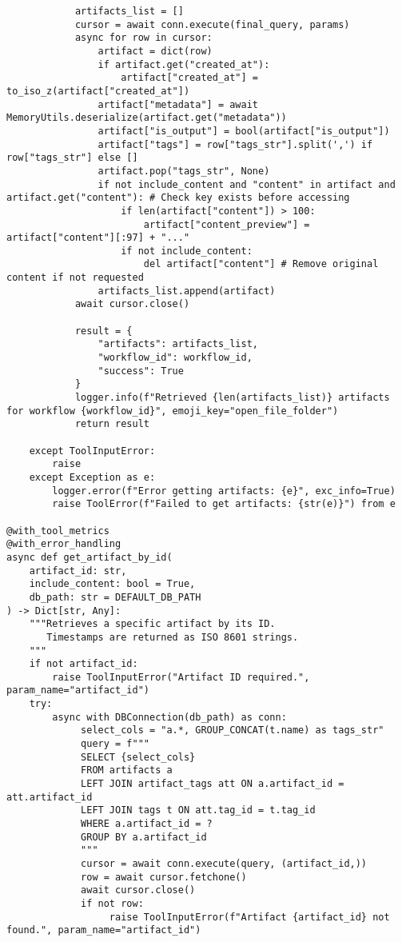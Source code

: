 \documentclass[12pt,a4paper]{article}
\begin{document}
\begin{pageablecode}
\begin{verbatim}
            artifacts_list = []
            cursor = await conn.execute(final_query, params)
            async for row in cursor:
                artifact = dict(row)
                if artifact.get("created_at"):
                    artifact["created_at"] = to_iso_z(artifact["created_at"])
                artifact["metadata"] = await MemoryUtils.deserialize(artifact.get("metadata"))
                artifact["is_output"] = bool(artifact["is_output"])
                artifact["tags"] = row["tags_str"].split(',') if row["tags_str"] else []
                artifact.pop("tags_str", None)
                if not include_content and "content" in artifact and artifact.get("content"): # Check key exists before accessing
                    if len(artifact["content"]) > 100:
                        artifact["content_preview"] = artifact["content"][:97] + "..."
                    if not include_content:
                        del artifact["content"] # Remove original content if not requested
                artifacts_list.append(artifact)
            await cursor.close()

            result = {
                "artifacts": artifacts_list,
                "workflow_id": workflow_id,
                "success": True
            }
            logger.info(f"Retrieved {len(artifacts_list)} artifacts for workflow {workflow_id}", emoji_key="open_file_folder")
            return result

    except ToolInputError:
        raise
    except Exception as e:
        logger.error(f"Error getting artifacts: {e}", exc_info=True)
        raise ToolError(f"Failed to get artifacts: {str(e)}") from e

@with_tool_metrics
@with_error_handling
async def get_artifact_by_id(
    artifact_id: str,
    include_content: bool = True,
    db_path: str = DEFAULT_DB_PATH
) -> Dict[str, Any]:
    """Retrieves a specific artifact by its ID.
       Timestamps are returned as ISO 8601 strings.
    """
    if not artifact_id:
        raise ToolInputError("Artifact ID required.", param_name="artifact_id")
    try:
        async with DBConnection(db_path) as conn:
             select_cols = "a.*, GROUP_CONCAT(t.name) as tags_str"
             query = f"""
             SELECT {select_cols}
             FROM artifacts a
             LEFT JOIN artifact_tags att ON a.artifact_id = att.artifact_id
             LEFT JOIN tags t ON att.tag_id = t.tag_id
             WHERE a.artifact_id = ?
             GROUP BY a.artifact_id
             """
             cursor = await conn.execute(query, (artifact_id,))
             row = await cursor.fetchone()
             await cursor.close()
             if not row:
                  raise ToolInputError(f"Artifact {artifact_id} not found.", param_name="artifact_id")


\end{verbatim}
\end{pageablecode}
\end{document}
